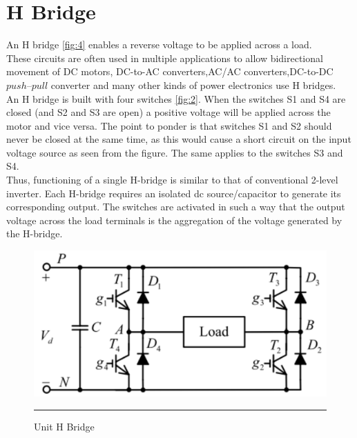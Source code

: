 \section{H Bridge}An H bridge \ref{fig:4} enables a reverse voltage to be applied across a load.\\
These circuits are often used in multiple applications to allow bidirectional movement of DC motors,
DC-to-AC converters,AC/AC converters,DC-to-DC $push–pull$ converter and many other kinds of power electronics use H bridges.\\
 An H bridge is built with four switches \ref{fig:2}. When the switches S1 and S4 are closed (and S2 and S3 are open) a positive voltage will be applied across the motor and vice versa. The point to ponder is that switches S1 and S2 should never be closed at the same time, as this would cause a short circuit on the input voltage source as seen from the figure. The same applies to the switches S3 and S4.\\
 Thus, functioning of a single H-bridge is similar to that of
conventional 2-level inverter. Each H-bridge requires an
isolated dc source/capacitor to generate its corresponding
output. The switches are activated in such a way that the
output voltage across the load terminals is the aggregation
of the voltage generated by the H-bridge.
 
\begin{figure}[htbp]
	\centering
		\includegraphics[width = 5in]{./Figures/h-bridge.pdf}
		\rule{35em}{3pt}
	\caption{Unit H Bridge}
	\label{fig:5}
\end{figure}
